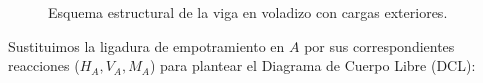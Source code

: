\begin{figure}[H]
{%

    }

    \caption{Esquema estructural de la viga en voladizo con cargas exteriores.}

    \label{fig:ejemplo17_esquema}

\end{figure}






Sustituimos la ligadura de empotramiento en $A$ por sus correspondientes reacciones ($H_A, V_A, M_A$) para plantear el Diagrama de Cuerpo Libre (DCL):



